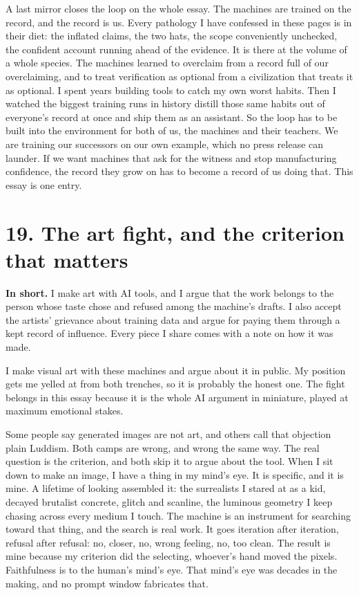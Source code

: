 \documentclass[11pt]{article}
\begin{document}
A last mirror closes the loop on the whole essay. The machines are trained on the record, and the record is us. Every pathology I have confessed in these pages is in their diet: the inflated claims, the two hats, the scope conveniently unchecked, the confident account running ahead of the evidence. It is there at the volume of a whole species. The machines learned to overclaim from a record full of our overclaiming, and to treat verification as optional from a civilization that treats it as optional. I spent years building tools to catch my own worst habits. Then I watched the biggest training runs in history distill those same habits out of everyone's record at once and ship them as an assistant. So the loop has to be built into the environment for both of us, the machines and their teachers. We are training our successors on our own example, which no press release can launder. If we want machines that ask for the witness and stop manufacturing confidence, the record they grow on has to become a record of us doing that. This essay is one entry.

\section*{19. The art fight, and the criterion that matters}

\textbf{In short.} I make art with AI tools, and I argue that the work belongs to the person whose taste chose and refused among the machine's drafts. I also accept the artists' grievance about training data and argue for paying them through a kept record of influence. Every piece I share comes with a note on how it was made.

I make visual art with these machines and argue about it in public. My position gets me yelled at from both trenches, so it is probably the honest one. The fight belongs in this essay because it is the whole AI argument in miniature, played at maximum emotional stakes.

Some people say generated images are not art, and others call that objection plain Luddism. Both camps are wrong, and wrong the same way. The real question is the criterion, and both skip it to argue about the tool. When I sit down to make an image, I have a thing in my mind's eye. It is specific, and it is mine. A lifetime of looking assembled it: the surrealists I stared at as a kid, decayed brutalist concrete, glitch and scanline, the luminous geometry I keep chasing across every medium I touch. The machine is an instrument for searching toward that thing, and the search is real work. It goes iteration after iteration, refusal after refusal: no, closer, no, wrong feeling, no, too clean. The result is mine because my criterion did the selecting, whoever's hand moved the pixels. Faithfulness is to the human's mind's eye. That mind's eye was decades in the making, and no prompt window fabricates that.
\end{document}
